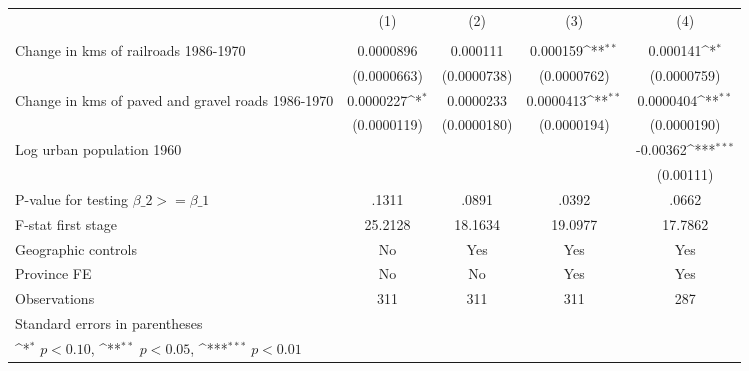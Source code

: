{
\def\sym#1{\ifmmode^{#1}\else\(^{#1}\)\fi}
\begin{tabular}{l*{4}{c}}
\hline\hline
                &\multicolumn{1}{c}{(1)}&\multicolumn{1}{c}{(2)}&\multicolumn{1}{c}{(3)}&\multicolumn{1}{c}{(4)}\\
                &\multicolumn{1}{c}{}&\multicolumn{1}{c}{}&\multicolumn{1}{c}{}&\multicolumn{1}{c}{}\\
\hline
Change in kms of railroads 1986-1970&0.0000896         & 0.000111         & 0.000159\sym{**} & 0.000141\sym{*}  \\
                &(0.0000663)         &(0.0000738)         &(0.0000762)         &(0.0000759)         \\
[1em]
Change in kms of paved and gravel roads 1986-1970&0.0000227\sym{*}  &0.0000233         &0.0000413\sym{**} &0.0000404\sym{**} \\
                &(0.0000119)         &(0.0000180)         &(0.0000194)         &(0.0000190)         \\
[1em]
Log urban population 1960&                  &                  &                  & -0.00362\sym{***}\\
                &                  &                  &                  &(0.00111)         \\
\hline
P-value for testing $\beta\_{2} >= \beta\_{1}$&    .1311         &    .0891         &    .0392         &    .0662         \\
F-stat first stage&  25.2128         &  18.1634         &  19.0977         &  17.7862         \\
Geographic controls&       No         &      Yes         &      Yes         &      Yes         \\
Province FE     &       No         &       No         &      Yes         &      Yes         \\
Observations    &      311         &      311         &      311         &      287         \\
\hline\hline
\multicolumn{5}{l}{\footnotesize Standard errors in parentheses}\\
\multicolumn{5}{l}{\footnotesize \sym{*} \(p<0.10\), \sym{**} \(p<0.05\), \sym{***} \(p<0.01\)}\\
\end{tabular}
}
